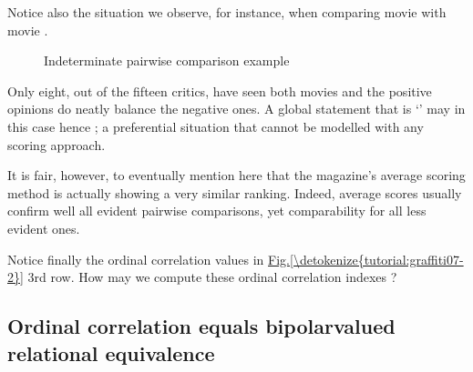 \documentclass[a4paper,10pt,english]{sphinxhowto}
\let\sphinxpxdimen\pdfpxdimen\else\newdimen\sphinxpxdimen
\begin{document}
Notice also the  situation we observe, for instance, when comparing movie  with movie .

\begin{sphinxVerbatim}[commandchars=\\\{\}]
\end{sphinxVerbatim}

\begin{figure}[htbp]
\centering
\capstart

\noindent\sphinxincludegraphics[width=400\sphinxpxdimen]{{graffiti07_6}.png}
\caption{Indeterminate pairwise comparison example}\label{\detokenize{tutorial:id143}}\end{figure}

Only eight, out of the fifteen critics, have seen both movies and the positive opinions do neatly balance the negative ones. A global statement that  is ‘’   may in this case hence ; a preferential situation that cannot be modelled with any scoring approach.

It is fair, however, to eventually mention here that the  magazine’s average scoring method is actually showing a very similar ranking. Indeed, average scores usually confirm well all evident pairwise comparisons, yet  comparability for all less evident ones.

Notice finally the ordinal correlation  values in
\hyperref[\detokenize{tutorial:graffiti07-2}]{Fig.\@ \ref{\detokenize{tutorial:graffiti07-2}}} 3rd row. How may we compute these ordinal correlation indexes ?


\subsection{Ordinal correlation equals bipolar\sphinxhyphen{}valued relational equivalence}
\label{\detokenize{tutorial:ordinal-correlation-equals-bipolar-valued-relational-equivalence}}
\end{document}
